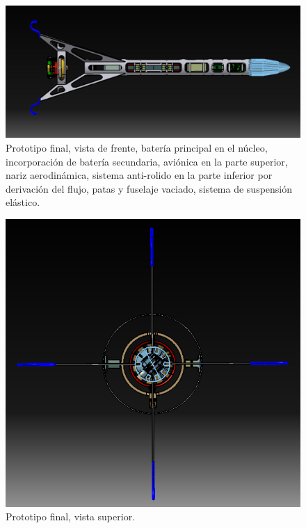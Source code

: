 \begin{figure}[htb]
    \centering
    \includegraphics[width=\linewidth]{fig/design/v6}
    \caption{Prototipo final, vista de frente, batería principal en el núcleo, incorporación de batería secundaria, aviónica en la parte superior, nariz aerodinámica, sistema anti-rolido en la parte inferior por derivación del flujo, patas y fuselaje vaciado, sistema de suspensión elástico.}
    \label{fig:design/v6}
\end{figure}

\begin{figure}[htb]
    \centering
    \includegraphics[width=\linewidth]{fig/design/v6_1}
    \caption{Prototipo final, vista superior.}
    \label{fig:design/v6_1}
\end{figure}


